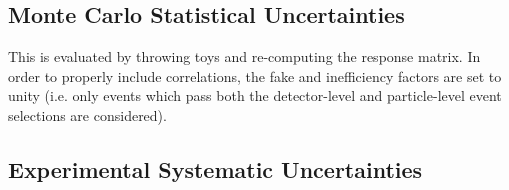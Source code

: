 \subsection{Monte Carlo Statistical Uncertainties}
\label{sec:gbb-systs:MCstat}

This is evaluated by throwing toys and re-computing the response matrix. In order to properly include correlations, the fake and inefficiency factors are set to unity (i.e. only events which pass both the detector-level and particle-level event selections are considered).

\subsection{Experimental Systematic Uncertainties}
\label{sec:gbb-systs:exp}


